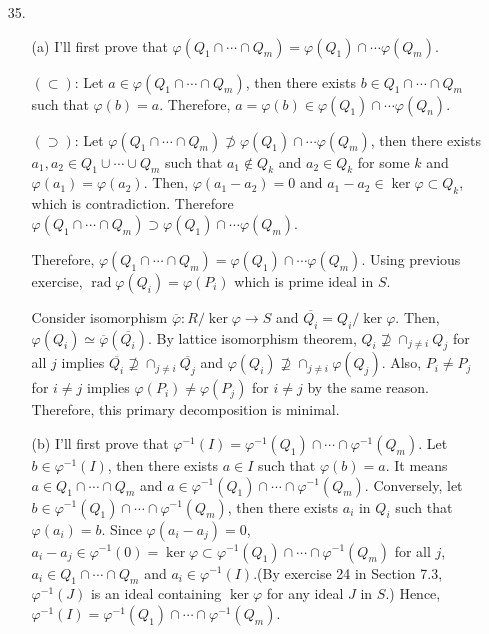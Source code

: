 \documentclass[12pt]{article}
\DeclareMathOperator{\rad}{\mathrm{rad}}
\newcommand{\Z}{\mathcal{Z}}
\begin{document}
\begin{enumerate}
\begin{proof}
Conversely, suppose that $\Delta$ is closed, then for any $(x,y)$, $x\neq y$, there exists open set containing $(x,y)$ disjoint with $\Delta$. By the definition of product topology, there exist two disjoint open set $x\in U$, $y\in V$. Therefore, $X$ is Hausdorff space.
\end{proof}
Consider $\Z((y-x))$ in $k^2$. This is diagonal set in $k^2$ and closed by the definition of Zarisky topology. However, this is not closed in product topology of $k^2$ since Zarisky topology on $k$ is not Hausdorff: all the polynomials on $k[x]$ has finitely many roots, which means this is co-finite topology.
\newpage
\item[35.]
\begin{enumerate}
\item[(a)] I'll first prove that $\varphi(Q_1\cap \cdots \cap Q_m)=\varphi(Q_1)\cap \cdots \varphi(Q_m)$.

$(\subset)$: Let $a\in \varphi(Q_1\cap \cdots \cap Q_m)$, then there exists $b\in Q_1\cap \cdots \cap Q_m$ such that $\varphi(b)=a$. Therefore, $a=\varphi(b)\in \varphi(Q_1)\cap \cdots \varphi(Q_n)$.

$(\supset)$: Let $\varphi(Q_1\cap \cdots \cap Q_m)\not\supset\varphi(Q_1)\cap \cdots \varphi(Q_m)$, then there exists $a_1,a_2\in Q_1\cup \cdots\cup Q_m$ such that $a_1\notin Q_k$ and $a_2\in Q_k$ for some $k$ and $\varphi(a_1)=\varphi(a_2)$. Then, $\varphi(a_1-a_2)=0$ and $a_1-a_2\in \ker\varphi\subset Q_k$, which is contradiction. Therefore $\varphi(Q_1\cap \cdots \cap Q_m)\supset\varphi(Q_1)\cap \cdots \varphi(Q_m)$.

Therefore, $\varphi(Q_1\cap \cdots \cap Q_m)=\varphi(Q_1)\cap \cdots \varphi(Q_m)$. Using previous exercise, $\rad\varphi(Q_i)=\varphi(P_i)$ which is prime ideal in $S$.

Consider isomorphism $\overline{\varphi}:R/\ker\varphi\rightarrow S$ and $\overline{Q_i}=Q_i/\ker\varphi$. Then, $\varphi(Q_i)\simeq \overline{\varphi}(\overline{Q_i})$. By lattice isomorphism theorem, $Q_i\nsupseteq \cap_{j\neq i}Q_j$ for all $j$ implies $\overline{Q_i}\nsupseteq \cap_{j\neq i}\overline{Q_j}$ and $\varphi(Q_i)\nsupseteq \cap_{j\neq i}\varphi(Q_j)$. Also, $P_i\neq P_j$ for $i\neq j$ implies $\varphi(P_i)\neq \varphi(P_j)$ for $i\neq j$ by the same reason. Therefore, this primary decomposition is minimal.

\item[(b)]I'll first prove that $\varphi^{-1}(I)=\varphi^{-1}(Q_1)\cap \cdots\cap \varphi^{-1}(Q_m)$. Let $b\in \varphi^{-1}(I)$, then there exists $a\in I$ such that $\varphi(b)=a$. It means $a\in Q_1\cap \cdots \cap Q_m$ and $a\in \varphi^{-1}(Q_1)\cap\cdots\cap\varphi^{-1}(Q_m)$. Conversely, let $b\in \varphi^{-1}(Q_1)\cap\cdots\cap \varphi^{-1}(Q_m)$, then there exists $a_i$ in $Q_i$ such that $\varphi(a_i)=b$. Since $\varphi(a_i-a_j)=0$, $a_i-a_j\in \varphi^{-1}(0)=\ker\varphi\subset \varphi^{-1}(Q_1)\cap\cdots\cap\varphi^{-1}(Q_m)$ for all $j$, $a_i\in Q_1\cap\cdots\cap Q_m$ and $a_i\in \varphi^{-1}(I)$.(By exercise 24 in Section 7.3, $\varphi^{-1}(J)$ is an ideal containing $\ker\varphi$ for any ideal $J$ in $S$.) Hence, $\varphi^{-1}(I)=\varphi^{-1}(Q_1)\cap\cdots\cap\varphi^{-1}(Q_m)$.


\end{enumerate}
\end{enumerate}
\end{document}
